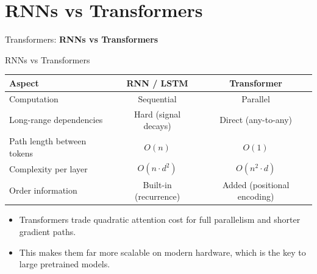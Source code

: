 \section{RNNs vs Transformers}
\begin{frame}{}
    \LARGE Transformers: \textbf{RNNs vs Transformers}
\end{frame}

\begin{frame}{RNNs vs Transformers}
    \begin{table}[]
    \centering
    \begin{tabular}{|l|c|c|}
    \hline
    \textbf{Aspect} & \textbf{RNN / LSTM} & \textbf{Transformer} \\
    \hline
    Computation & Sequential & Parallel \\
    Long-range dependencies & Hard (signal decays) & Direct (any-to-any) \\
    Path length between tokens & $O(n)$ & $O(1)$ \\
    Complexity per layer & $O(n \cdot d^2)$ & $O(n^2 \cdot d)$ \\
    Order information & Built-in (recurrence) & Added (positional encoding) \\
    \hline
    \end{tabular}
    \end{table}
    \vspace{0.4cm}
    \begin{itemize}
        \item Transformers trade quadratic attention cost for full parallelism and shorter gradient paths.
        \item This makes them far more scalable on modern hardware, which is the key to large pretrained models.
    \end{itemize}
\end{frame}
